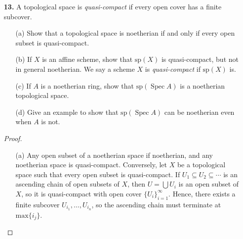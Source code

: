 \documentclass{article}
\newcommand{\fO}{\mathscr{O}}
\DeclareMathOperator{\spec}{Spec}
\newcommand\restr[2]{{%
  \left.\kern-\nulldelimiterspace %
  #1 %
  \vphantom{\big|} %
  \right|_{#2} %
}}
\begin{document}
\begin{enumerate} [label=\textbf{\arabic*.}, leftmargin=0em]
\begin{proof}
    Let $X = \coprod X_i / \sim$, where the equivalence relation identifies $U_{ij}$ with $U_{ji}$ for all $i \neq j$. It is a scheme topologically, that is there is an open cover of $X$ such that each element of the cover is homeomorphic to the spectra of some ring. We have already have a scheme struture on each open subset $X_i$ of $X$, so by Exercise 1.22 we can obtain a unique sheaf on $X$ satisfies the properties above. In particular, the structure sheaf of $X$ is given by
    \begin{equation*}
        \fO_X(V) = \{ \langle s_i \rangle_{i \in I} \mid s_i \in \fO_X(\iota_i^{-1}(V)) \text{ and } \varphi_{ij}(\restr{s_i}{\iota^{-1}_i(V) \cap U_{ij}}) = \restr{s_j}{\iota_j^{-1}(V) \cap U_j} \}.
    \end{equation*}
\end{proof}

\item[\textbf{13.}] A topological space is \textit{quasi-compact} if every open cover has a finite subcover.
\begin{itemize} [leftmargin=0cm]
    \item[(a)] Show that a topological space is noetherian if and only if every open subset is quasi-compact.
    \item[(b)] If $X$ is an affine scheme, show that $\text{sp}(X)$ is quasi-compact, but not in general noetherian. We say a scheme $X$ is \textit{quasi-compact} if $\text{sp}(X)$ is.
    \item[(c)] If $A$ is a noetherian ring, show that $\text{sp}(\spec{A})$ is a noetherian topological space.
    \item[(d)] Give an example to show that $\text{sp}(\spec{A})$ can be noetherian even when $A$ is not.
\end{itemize}

\begin{proof} $ $ \vspace{0pt}
    \begin{itemize} [leftmargin=0cm]
        \item[(a)] Any open subset of a noetherian space if noetherian, and any noetherian space is quasi-compact. Conversely, let $X$ be a topological space such that every open subset is quasi-compact. If $U_1 \subseteq U_2 \subseteq \cdots$ is an ascending chain of open subsets of $X$, then $U = \bigcup U_i$ is an open subset of $X$, so it is quasi-compact with open cover $\{ U_i \}_{i = 1}^\infty$. Hence, there exists a finite subcover $U_{i_1}, \dots, U_{i_n}$, so the ascending chain must terminate at $\text{max}\{i_j \}$. 


\end{itemize}
\end{proof}
\end{enumerate}
\end{document}
